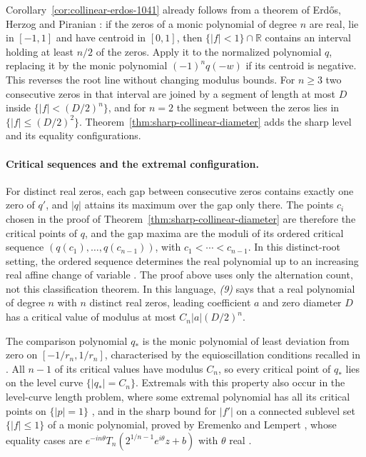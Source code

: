 \documentclass[11pt]{article}
\begin{document}
Corollary~\ref{cor:collinear-erdos-1041} already follows from a theorem of
Erd\H{o}s, Herzog and Piranian \cite[Theorem~1, p.~126]{ehp1958}: if the zeros
of a monic polynomial of degree $n$ are real, lie in $[-1,1]$ and have
centroid in $[0,1]$, then $\{|f|<1\}\cap\mathbb R$ contains an interval
holding at least $n/2$ of the zeros.  Apply it to the normalized polynomial
$q$, replacing it by the monic polynomial $(-1)^nq(-w)$ if its centroid
is negative. This reverses the root line without changing modulus bounds. For
$n\ge3$ two consecutive zeros in that interval are joined by a segment of
length at most $D$ inside $\{|f|<(D/2)^n\}$, and for $n=2$ the segment between
the zeros lies in $\{|f|\le(D/2)^2\}$.
Theorem~\ref{thm:sharp-collinear-diameter} adds the sharp level and its
equality configurations.

\paragraph{Critical sequences and the extremal configuration.}
\hypertarget{collinear-source-comparison}{}
For distinct real zeros, each gap between consecutive zeros contains exactly
one zero of $q'$, and $|q|$ attains its maximum over the gap only there.  The
points $c_i$ chosen in the proof of Theorem~\ref{thm:sharp-collinear-diameter}
are therefore the critical points of $q$, and the gap maxima are the moduli of
its ordered critical sequence $(q(c_1),\ldots,q(c_{n-1}))$, with
$c_1<\cdots<c_{n-1}$. In this distinct-root setting, the ordered sequence
determines the real polynomial up to an increasing real affine change
of variable \cite[Theorem~1]{eremenkoyuditskii2012}. The proof above uses
only the alternation count, not this classification theorem.  In this language, \emph{(9)} says that a
real polynomial of degree $n$ with $n$ distinct real zeros, leading
coefficient $a$ and zero diameter $D$ has a critical value of modulus at most
$C_n|a|(D/2)^n$.

The comparison polynomial $q_*$ is the monic polynomial of least deviation
from zero on $[-1/r_n,1/r_n]$, characterised by the equioscillation conditions
recalled in \cite[\S1]{eremenkoyuditskii2012}.  All $n-1$ of its critical
values have modulus $C_n$, so every critical point of $q_*$ lies on the level
curve $\{|q_*|=C_n\}$.  Extremals with this property also occur in the
level-curve length problem, where some extremal polynomial has all its
critical points on $\{|p|=1\}$ \cite[Lemma~5]{eremenkohayman1999}, and in the
sharp bound for $|f'|$ on a connected sublevel set $\{|f|\le1\}$ of a monic
polynomial, proved by Eremenko and Lempert
\cite[Theorem~1]{eremenkolempert1994}, whose
equality cases are $e^{-in\theta}T_n(2^{1/n-1}e^{i\theta}z+b)$ with $\theta$
real \cite[Theorem~A]{eremenko2007}.
\end{document}
